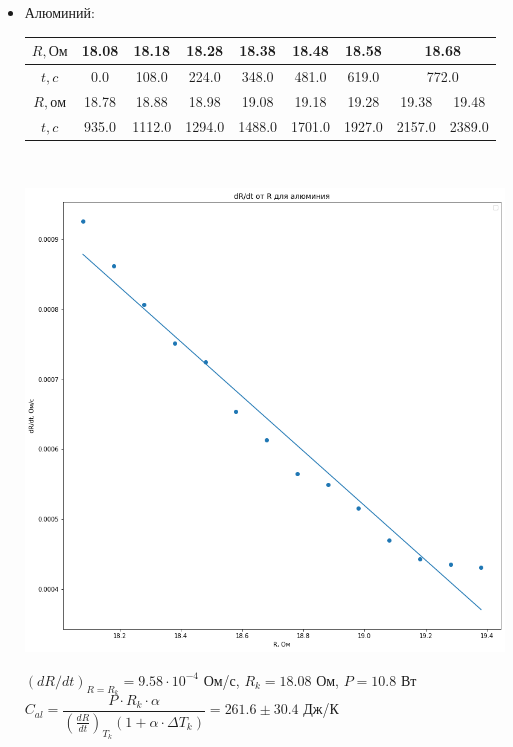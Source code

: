 \documentclass[12pt,a4paper]{article}
\begin{document}
\begin{enumerate}
		\begin{itemize}
			\item Алюминий: \\
				
				\begin{tabular}{|c|c|c|c|c|c|c|c|c|} \hline
				$R, Ом$ & 18.08 & 18.18 & 18.28 & 18.38 & 18.48 & 18.58 & \multicolumn{2}{|c|}{18.68} \\ \hline
					$t, c$ & 0.0 & 108.0 & 224.0 & 348.0 & 481.0 & 619.0 & \multicolumn{2}{|c|}{772.0} \\ \hline
					$R, ом$ & 18.78 & 18.88 & 18.98 & 19.08 & 19.18 & 19.28 & 19.38 & 19.48 \\ \hline
					$t, c$ & 935.0 & 1112.0 & 1294.0 & 1488.0 & 1701.0 & 1927.0 & 2157.0 & 2389.0 \\ \hline
				\end{tabular} \\	
				
				\begin{center}
					\includegraphics[scale=0.5]{g2.png}
				\end{center}								
				
				$(dR/dt)_{R=R_k} = 9.58 \cdot 10^{-4}$ Ом/с, $R_k = 18.08$ Ом, $P = 10.8$ Вт \\
		$C_{al} = \dfrac{P \cdot R_k \cdot \alpha}{\left( \frac{dR}{dt} \right)_{T_k} \left( 1 + \alpha \cdot \Delta T_k \right)} = 261.6 \pm 30.4$ Дж/К \\
		

\end{itemize}
\end{enumerate}
\end{document}
